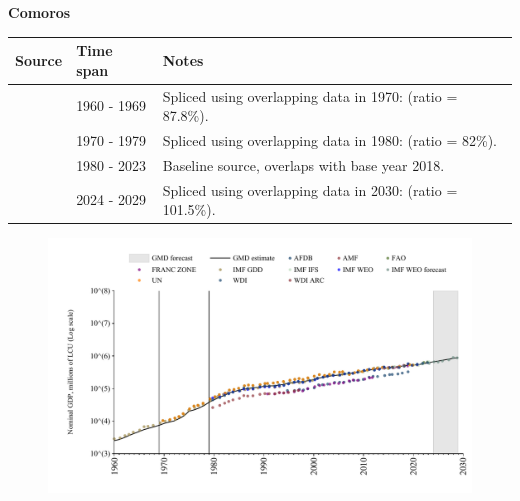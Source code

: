 \documentclass[12pt,a4paper,landscape]{article}
\begin{document}
\begin{adjustbox}{max totalsize={\paperwidth}{\paperheight},center}
\begin{minipage}[t][\textheight][t]{\textwidth}
\vspace*{0.5cm}
{}
\begin{center}
{\Large\bfseries Comoros}
\end{center}
\vspace{0.5cm}
\begin{table}[H]
\centering
\small
\begin{tabular}{|l|l|l|}
\hline
\textbf{Source} & \textbf{Time span} & \textbf{Notes} \\
\hline
\rowcolor{white}\cite{IMF_GDD}& 1960 - 1969 &Spliced using overlapping data in 1970: (ratio = 87.8\%).\\
\rowcolor{lightgray}\cite{UN}& 1970 - 1979 &Spliced using overlapping data in 1980: (ratio = 82\%).\\
\rowcolor{white}\cite{WDI}& 1980 - 2023 &Baseline source, overlaps with base year 2018.\\
\rowcolor{lightgray}\cite{IMF_WEO_forecast}& 2024 - 2029 &Spliced using overlapping data in 2030: (ratio = 101.5\%).\\
\hline
\end{tabular}
\end{table}
\begin{figure}[H]
\centering
\includegraphics[width=\textwidth,height=0.6\textheight,keepaspectratio]{graphs/COM_nGDP.pdf}
\end{figure}
\end{minipage}
\end{adjustbox}
\end{document}
